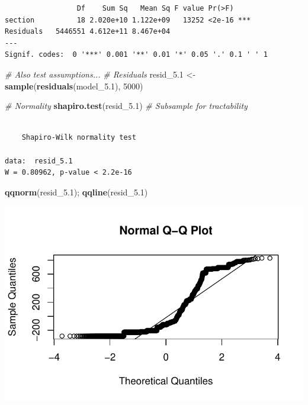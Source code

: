\documentclass[
  british,
  10pt,
]{article}
\newenvironment{Shaded}{\begin{snugshade}}{\end{snugshade}}
\newcommand{\CommentTok}[1]{\textcolor[rgb]{0.56,0.35,0.01}{\textit{#1}}}
\newcommand{\DecValTok}[1]{\textcolor[rgb]{0.00,0.00,0.81}{#1}}
\newcommand{\FloatTok}[1]{\textcolor[rgb]{0.00,0.00,0.81}{#1}}
\newcommand{\FunctionTok}[1]{\textcolor[rgb]{0.13,0.29,0.53}{\textbf{#1}}}
\newcommand{\NormalTok}[1]{#1}
\newcommand{\OtherTok}[1]{\textcolor[rgb]{0.56,0.35,0.01}{#1}}
\begin{document}
\begin{verbatim}
                 Df    Sum Sq   Mean Sq F value Pr(>F)    
section          18 2.020e+10 1.122e+09   13252 <2e-16 ***
Residuals   5446551 4.612e+11 8.467e+04                   
---
Signif. codes:  0 '***' 0.001 '**' 0.01 '*' 0.05 '.' 0.1 ' ' 1
\end{verbatim}

\begin{Shaded}
\begin{Highlighting}[]
\CommentTok{\# Also test assumptions...}
\CommentTok{\# Residuals}
\NormalTok{resid\_5}\FloatTok{.1} \OtherTok{\textless{}{-}} \FunctionTok{sample}\NormalTok{(}\FunctionTok{residuals}\NormalTok{(model\_5}\FloatTok{.1}\NormalTok{), }\DecValTok{5000}\NormalTok{)}

\CommentTok{\# Normality}
\FunctionTok{shapiro.test}\NormalTok{(resid\_5}\FloatTok{.1}\NormalTok{)  }\CommentTok{\# Subsample for tractability}
\end{Highlighting}
\end{Shaded}

\begin{verbatim}

    Shapiro-Wilk normality test

data:  resid_5.1
W = 0.80962, p-value < 2.2e-16
\end{verbatim}

\begin{Shaded}
\begin{Highlighting}[]
\FunctionTok{qqnorm}\NormalTok{(resid\_5}\FloatTok{.1}\NormalTok{); }\FunctionTok{qqline}\NormalTok{(resid\_5}\FloatTok{.1}\NormalTok{)}
\end{Highlighting}
\end{Shaded}

\begin{center}
\includegraphics[width=0.6\linewidth,height=\textheight,keepaspectratio]{BCB744_Biostats_Prac_Exam_2025_files/figure-pdf/chunk17-1.pdf}
\end{center}
\end{document}
